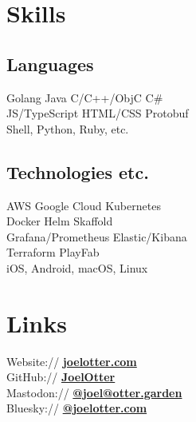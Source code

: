 \documentclass[]{deedy-resume-openfont}
\begin{document}
%
%



%
%

\begin{minipage}[t]{0.33\textwidth} 


\section{Skills}
\subsection{Languages}
Golang \textbullet{}   Java \textbullet{} C/C++/ObjC \textbullet{} C\# \\
JS/TypeScript \textbullet{} HTML/CSS \textbullet{} Protobuf \\
Shell, Python, Ruby, etc.
\sectionsep
\subsection{Technologies etc.}
AWS \textbullet{} Google Cloud \textbullet{} Kubernetes \\
Docker \textbullet{} Helm \textbullet{} Skaffold \\
Grafana/Prometheus \textbullet{} Elastic/Kibana \\
Terraform \textbullet{} PlayFab \\
iOS, Android, macOS, Linux \\
\sectionsep


\section{Links} 
Website:// \href{https://www.joelotter.com}{\bf{joelotter.com}} \\
GitHub:// \href{http://github.com/JoelOtter}{\bf{JoelOtter}} \\
Mastodon://  \href{https://otter.garden/@joel}{\bf{@joel@otter.garden}} \\
Bluesky://  \href{https://bsky.app/joelotter.com}{\bf{@joelotter.com}} \\
\sectionsep


\end{minipage}
\end{document}
